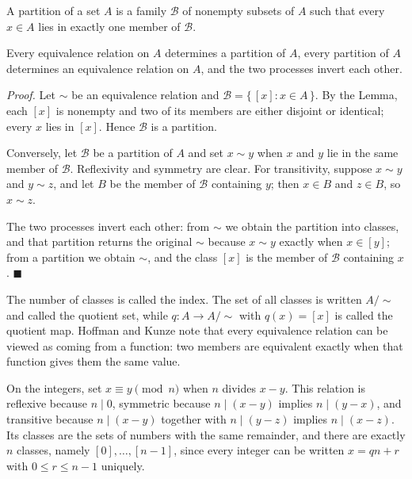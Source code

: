 \begin{definisi}[Partition]
A partition of a set $A$ is a family $\mathcal{B}$ of nonempty subsets of $A$ such
that every $x \in A$ lies in exactly one member of $\mathcal{B}$.
\end{definisi}

\begin{teorema}
Every equivalence relation on $A$ determines a partition of $A$, every partition of
$A$ determines an equivalence relation on $A$, and the two processes invert each
other.
\end{teorema}
\par\smallskip\noindent\textit{Proof.} Let $\sim$ be an equivalence relation and
$\mathcal{B} = \{\, [x] : x \in A \,\}$. By the Lemma, each $[x]$ is nonempty and two
of its members are either disjoint or identical; every $x$ lies in $[x]$. Hence
$\mathcal{B}$ is a partition.

Conversely, let $\mathcal{B}$ be a partition of $A$ and set $x \sim y$ when $x$ and
$y$ lie in the same member of $\mathcal{B}$. Reflexivity and symmetry are clear. For
transitivity, suppose $x \sim y$ and $y \sim z$, and let $B$ be the member of
$\mathcal{B}$ containing $y$; then $x \in B$ and $z \in B$, so $x \sim z$.

The two processes invert each other: from $\sim$ we obtain the partition into classes,
and that partition returns the original $\sim$ because $x \sim y$ exactly when
$x \in [y]$; from a partition we obtain $\sim$, and the class $[x]$ is the member of
$\mathcal{B}$ containing $x$.
\hfill$\blacksquare${\parfillskip=0pt\par}

The number of classes is called the index. The set of all classes is written
$A/{\sim}$ and called the quotient set, while $q : A \to A/{\sim}$ with $q(x) = [x]$
is called the quotient map. Hoffman and Kunze note that every equivalence relation can
be viewed as coming from a function: two members are equivalent exactly when that
function gives them the same value.

\begin{contoh}
On the integers, set $x \equiv y \pmod{n}$ when $n$ divides $x-y$. This relation is
reflexive because $n \mid 0$, symmetric because $n \mid (x-y)$ implies
$n \mid (y-x)$, and transitive because $n \mid (x-y)$ together with
$n \mid (y-z)$ implies $n \mid (x-z)$. Its classes are the sets of numbers with the
same remainder, and there are exactly $n$ classes, namely $[0], \dots, [n-1]$, since
every integer can be written $x = qn + r$ with $0 \le r \le n-1$ uniquely.
\end{contoh}

